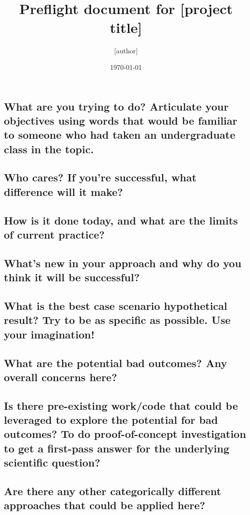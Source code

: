 \documentclass[11pt]{article}
\title{Preflight document for [project title]}
\author{[author]}
\date{\today}
\begin{document}
\maketitle


\subsection*{What are you trying to do? Articulate your objectives using words that would be familiar to someone who had taken an undergraduate class in the topic.}

\subsection*{Who cares? If you're successful, what difference will it make?}

\subsection*{How is it done today, and what are the limits of current practice?}

\subsection*{What's new in your approach and why do you think it will be successful?}

\subsection*{What is the best case scenario hypothetical result? Try to be as specific as possible. Use your imagination!}

\subsection*{What are the potential bad outcomes? Any overall concerns here?}

\subsection*{Is there pre-existing work/code that could be leveraged to explore the potential for bad outcomes? To do proof-of-concept investigation to get a first-pass answer for the underlying scientific question?}

\subsection*{Are there any other categorically different approaches that could be applied here?}
\end{document}
